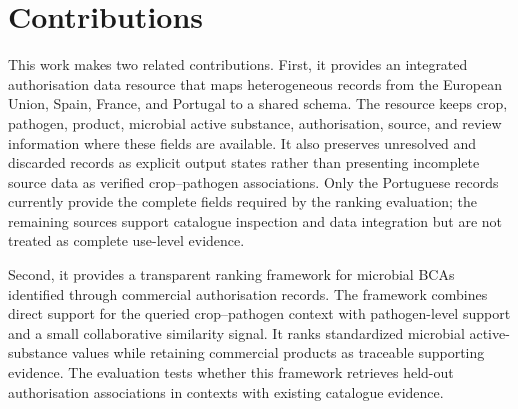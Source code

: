 \section{Contributions}\label{sec:research-goals}

This work makes two related contributions.
First, it provides an integrated authorisation data resource that maps heterogeneous records from the European Union, Spain, France, and Portugal to a shared schema.
The resource keeps crop, pathogen, product, microbial active substance, authorisation, source, and review information where these fields are available.
It also preserves unresolved and discarded records as explicit output states rather than presenting incomplete source data as verified crop--pathogen associations.
Only the Portuguese records currently provide the complete fields required by the ranking evaluation; the remaining sources support catalogue inspection and data integration but are not treated as complete use-level evidence.

Second, it provides a transparent ranking framework for microbial BCAs identified through commercial authorisation records.
The framework combines direct support for the queried crop--pathogen context with pathogen-level support and a small collaborative similarity signal.
It ranks standardized microbial active-substance values while retaining commercial products as traceable supporting evidence.
The evaluation tests whether this framework retrieves held-out authorisation associations in contexts with existing catalogue evidence.
